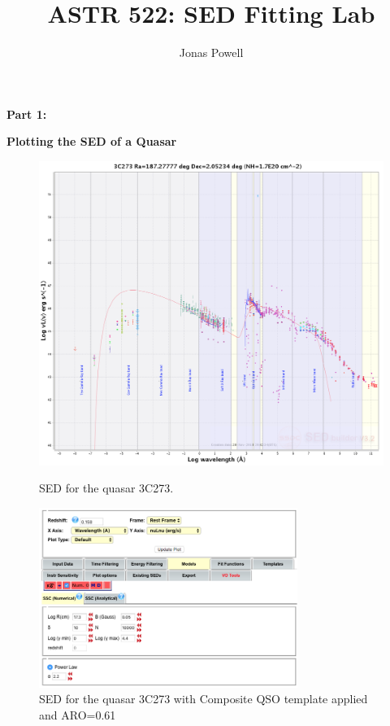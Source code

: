 \documentclass[12pt]{article}
\begin{document}
\title{\textbf{ASTR 522: SED Fitting Lab}}
\author{Jonas Powell}
\maketitle


\begin{onehalfspacing}




\raggedright{\textbf{\Large Part 1:}}\\
\raggedright{\textbf{\large Plotting the SED of a Quasar}}

\begin{figure}[h!]
    \centering
    \begin{minipage}{0.48\textwidth}
        \centering
        \includegraphics[width=1.05\textwidth]{part1} %
        \caption{SED for the quasar 3C273.}
    \end{minipage}\hfill
    \begin{minipage}{0.48\textwidth}
        \centering
        \includegraphics[width=0.75\textwidth]{part1_params} %
        \caption{SED for the quasar 3C273 with Composite QSO template applied and ARO=0.61}
    \end{minipage}\hfill
\end{figure}


\end{onehalfspacing}
\end{document}
